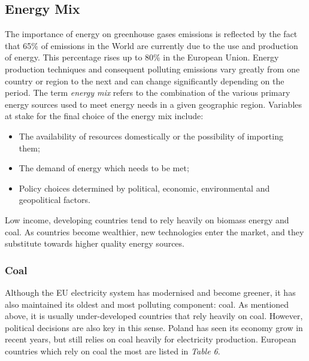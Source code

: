 \documentclass{book}
\begin{document}
\subsection*{Energy Mix}

The importance of energy on greenhouse gases emissions is reflected by the fact that 65\% of emissions in the World are currently due to the use and production of energy. This percentage rises up to 80\% in the European Union.\cite{marrero2010greenhouse} Energy production techniques and consequent polluting emissions vary greatly from one country or region to the next and can change significantly depending on the period. The term \textit{energy mix} refers to the combination of the various primary energy sources used to meet energy needs in a given geographic region. Variables at stake for the final choice of the energy mix include:

\begin{itemize}

\item The availability of resources domestically or the possibility of importing them;
\item The demand of energy which needs to be met;
\item Policy choices determined by political, economic, environmental and geopolitical factors.

\end{itemize}

Low income, developing countries tend to rely heavily on biomass energy and coal. \cite{international2009energy} As countries become wealthier, new technologies enter the market, and they substitute towards higher quality energy sources. \cite{csereklyei2016energy}

\subsubsection*{Coal}

Although the EU electricity system has modernised and become greener, it has also maintained its oldest and most polluting component: coal. As mentioned above, it is usually under-developed countries that rely heavily on coal. However, political decisions are also key in this sense. Poland has seen its economy grow in recent years, but still relies on coal heavily for electricity production. European countries which rely on coal the most are listed in \textit{Table 6}.
\end{document}
